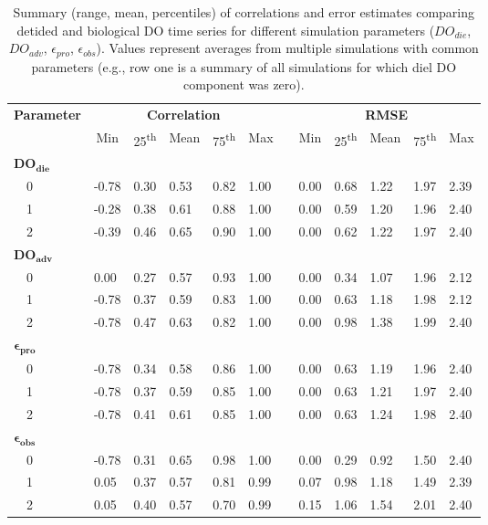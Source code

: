 \documentclass[letterpaper,12pt,oneside]{article}\usepackage[]{graphicx}\usepackage[]{color}
\begin{document}
%
\begin{table}[h]
\caption{Summary (range, mean, percentiles) of correlations and error estimates comparing detided and biological \ac{DO} time series for different simulation parameters ($DO_{die}$, $DO_{adv}$, $\epsilon_{pro}$, $\epsilon_{obs}$).  Values represent averages from multiple simulations with common parameters (e.g., row one is a summary of all simulations for which diel \ac{DO} component was zero).\label{tab:dtd_perf1}} 
\begin{center}
\begin{tabular}{llllllclllll}
\hline\hline
\multicolumn{1}{l}{\bfseries Parameter}&\multicolumn{5}{c}{\bfseries Correlation}&\multicolumn{1}{c}{\bfseries }&\multicolumn{5}{c}{\bfseries RMSE}\tabularnewline
\cline{2-6} \cline{8-12}
\multicolumn{1}{l}{}&\multicolumn{1}{c}{Min}&\multicolumn{1}{c}{25\textsuperscript{th}}&\multicolumn{1}{c}{Mean}&\multicolumn{1}{c}{75\textsuperscript{th}}&\multicolumn{1}{c}{Max}&\multicolumn{1}{c}{}&\multicolumn{1}{c}{Min}&\multicolumn{1}{c}{25\textsuperscript{th}}&\multicolumn{1}{c}{Mean}&\multicolumn{1}{c}{75\textsuperscript{th}}&\multicolumn{1}{c}{Max}\tabularnewline
\hline
{\bfseries $\boldsymbol{DO_{die}}$}&&&&&&&&&&&\tabularnewline
~~0&-0.78&0.30&0.53&0.82&1.00&&0.00&0.68&1.22&1.97&2.39\tabularnewline
~~1&-0.28&0.38&0.61&0.88&1.00&&0.00&0.59&1.20&1.96&2.40\tabularnewline
~~2&-0.39&0.46&0.65&0.90&1.00&&0.00&0.62&1.22&1.97&2.40\tabularnewline
\hline
{\bfseries $\boldsymbol{DO_{adv}}$}&&&&&&&&&&&\tabularnewline
~~0& 0.00&0.27&0.57&0.93&1.00&&0.00&0.34&1.07&1.96&2.12\tabularnewline
~~1&-0.78&0.37&0.59&0.83&1.00&&0.00&0.63&1.18&1.98&2.12\tabularnewline
~~2&-0.78&0.47&0.63&0.82&1.00&&0.00&0.98&1.38&1.99&2.40\tabularnewline
\hline
{\bfseries $\boldsymbol{\epsilon_{pro}}$}&&&&&&&&&&&\tabularnewline
~~0&-0.78&0.34&0.58&0.86&1.00&&0.00&0.63&1.19&1.96&2.40\tabularnewline
~~1&-0.78&0.37&0.59&0.85&1.00&&0.00&0.63&1.21&1.97&2.40\tabularnewline
~~2&-0.78&0.41&0.61&0.85&1.00&&0.00&0.63&1.24&1.98&2.40\tabularnewline
\hline
{\bfseries $\boldsymbol{\epsilon_{obs}}$}&&&&&&&&&&&\tabularnewline
~~0&-0.78&0.31&0.65&0.98&1.00&&0.00&0.29&0.92&1.50&2.40\tabularnewline
~~1& 0.05&0.37&0.57&0.81&0.99&&0.07&0.98&1.18&1.49&2.39\tabularnewline
~~2& 0.05&0.40&0.57&0.70&0.99&&0.15&1.06&1.54&2.01&2.40\tabularnewline
\hline
\end{tabular}
\end{center}
\end{table}
\end{document}
